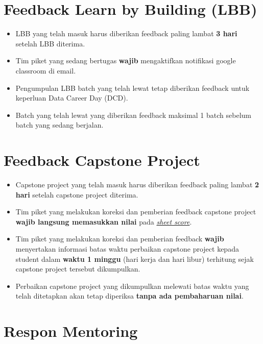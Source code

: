 \documentclass[
]{book}
\providecommand{\tightlist}{%
  \setlength{\itemsep}{0pt}\setlength{\parskip}{0pt}}
\begin{document}
\hypertarget{feedback-learn-by-building-lbb}{%
\section{Feedback Learn by Building (LBB)}\label{feedback-learn-by-building-lbb}}

\begin{itemize}
\tightlist
\item
  LBB yang telah masuk harus diberikan feedback paling lambat \textbf{3 hari} setelah LBB diterima.
\item
  Tim piket yang sedang bertugas \textbf{wajib} mengaktifkan notifikasi google classroom di email.
\item
  Pengumpulan LBB batch yang telah lewat tetap diberikan feedback untuk keperluan Data Career Day (DCD).
\item
  Batch yang telah lewat yang diberikan feedback maksimal 1 batch sebelum batch yang sedang berjalan.
\end{itemize}

\hypertarget{feedback-capstone-project}{%
\section{Feedback Capstone Project}\label{feedback-capstone-project}}

\begin{itemize}
\tightlist
\item
  Capstone project yang telah masuk harus diberikan feedback paling lambat \textbf{2 hari} setelah capstone project diterima.
\item
  Tim piket yang melakukan koreksi dan pemberian feedback capstone project \textbf{wajib langsung memasukkan nilai} pada \href{https://docs.google.com/spreadsheets/d/1cGJ0pn9k9gKCBnceWVwaL9D7BBDMNjLh8uPYlaBlJi8/edit?usp=sharing}{\emph{sheet score}}.
\item
  Tim piket yang melakukan koreksi dan pemberian feedback \textbf{wajib} menyertakan informasi batas waktu perbaikan capstone project kepada student dalam \textbf{waktu 1 minggu} (hari kerja dan hari libur) terhitung sejak capstone project tersebut dikumpulkan.
\item
  Perbaikan capstone project yang dikumpulkan melewati batas waktu yang telah ditetapkan akan tetap diperiksa \textbf{tanpa ada pembaharuan nilai}.
\end{itemize}

\hypertarget{respon-mentoring}{%
\section{Respon Mentoring}\label{respon-mentoring}}
\end{document}

